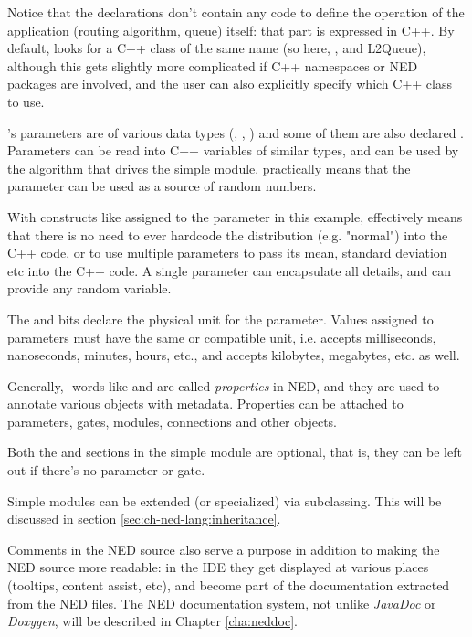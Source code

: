 Notice that the declarations don't contain any code to define the operation
of the application (routing algorithm, queue) itself:
that part is expressed in C++. By default, \opp looks for a
C++ class of the same name (so here, ,  and {L2Queue}),
although this gets slightly more complicated if C++ namespaces or
NED packages are involved, and the user can also explicitly specify
which C++ class to use.

's parameters are of various data types (, ,
) and some of them are also declared . Parameters
can be read into C++ variables of similar types, and can be used by the
algorithm that drives the simple module.  practically means
that the parameter can be used as a source of random numbers.

\begin{note}
    With constructs like  assigned to the 
    parameter in this example,  effectively means that
    there is no need to ever hardcode the distribution (e.g. "normal")
    into the C++ code, or to use multiple parameters to pass its mean,
    standard deviation etc into the C++ code. A single parameter can
    encapsulate all details, and can provide any random variable.
\end{note}

The  and  bits declare the physical unit
for the parameter. Values assigned to parameters must have the same or
compatible unit, i.e.  accepts milliseconds, nanoseconds,
minutes, hours, etc., and  accepts kilobytes, megabytes,
etc. as well.

Generally, -words like  and  are called
\textit{properties} in NED, and they are used to annotate various objects
with metadata. Properties can be attached to parameters, gates, modules,
connections and other objects.

Both the  and  sections in the simple module are
optional, that is, they can be left out if there's no parameter or gate.

Simple modules can be extended (or specialized) via subclassing. This will be
discussed in section \ref{sec:ch-ned-lang:inheritance}.

Comments in the NED source also serve a purpose in addition to making
the NED source more readable: in the \opp IDE they get displayed
at various places (tooltips, content assist, etc), and become part
of the documentation extracted from the NED files.
The NED documentation system, not unlike \textit{JavaDoc}
or \textit{Doxygen}, will be described in Chapter \ref{cha:neddoc}.

